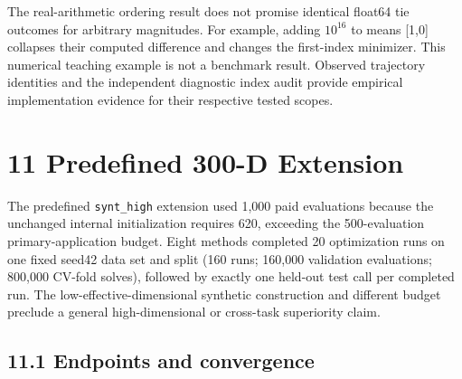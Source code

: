 \documentclass[11pt,a4paper]{article}
\begin{document}
The real-arithmetic ordering result does not promise identical float64
tie outcomes for arbitrary magnitudes. For example, adding \(10^{16}\)
to means {[}1,0{]} collapses their computed difference and changes the
first-index minimizer. This numerical teaching example is not a
benchmark result. Observed trajectory identities and the independent
diagnostic index audit provide empirical implementation evidence for
their respective tested scopes.

\hypertarget{predefined-300-d-extension}{%
\section{11 Predefined 300-D
Extension}\label{predefined-300-d-extension}}

The predefined \texttt{synt\_high} extension used 1,000 paid evaluations
because the unchanged internal initialization requires 620, exceeding
the 500-evaluation primary-application budget. Eight methods completed
20 optimization runs on one fixed seed42 data set and split (160 runs;
160,000 validation evaluations; 800,000 CV-fold solves), followed by
exactly one held-out test call per completed run. The
low-effective-dimensional synthetic construction and different budget
preclude a general high-dimensional or cross-task superiority claim.

\hypertarget{endpoints-and-convergence}{%
\subsection{11.1 Endpoints and
convergence}\label{endpoints-and-convergence}}
\end{document}

